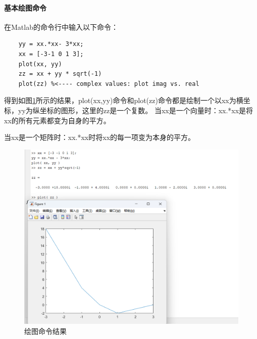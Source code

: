 \documentclass[UTF8]{ctexart}
\begin{document}
\paragraph{基本绘图命令}

在Matlab的命令行中输入以下命令：
\begin{verbatim}
    yy = xx.*xx- 3*xx;
    xx = [-3-1 0 1 3];
    plot(xx, yy)
    zz = xx + yy * sqrt(-1)
    plot(zz) %<---- complex values: plot imag vs. real
\end{verbatim}
得到如图\ref{img:plot}所示的结果，plot(xx,yy)命令和plot(zz)命令都是绘制一个以xx为横坐标，yy为纵坐标的图形，这里的zz是一个复数。
当xx是一个向量时：xx.*xx是将xx的所有元素都变为自身的平方。

当xx是一个矩阵时：xx.*xx时将xx的每一项变为本身的平方。
\begin{figure}[htbp]
    \centering
    \includegraphics[width=0.7\linewidth]{plot.png}
    \caption{绘图命令结果}
    \label{img:plot}
\end{figure}
\end{document}
